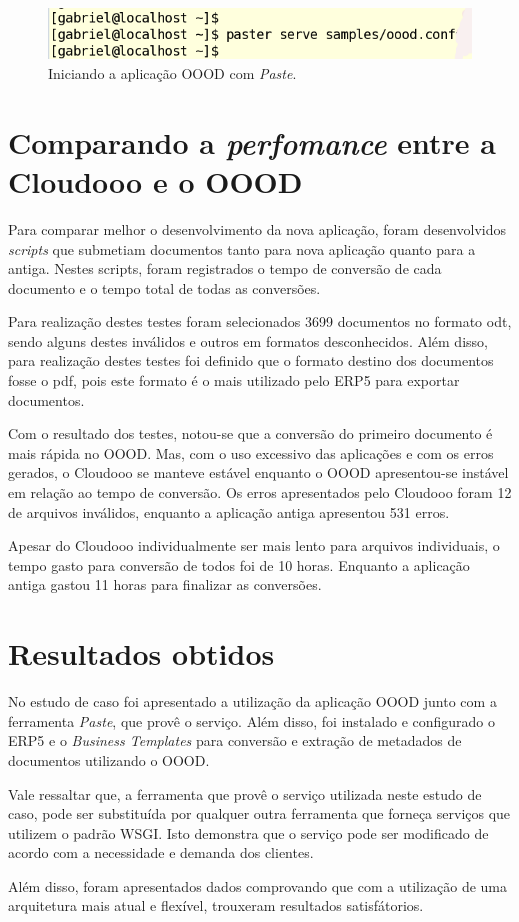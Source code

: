 \begin{figure}[!ht]
\centering
\begin{center}
\includegraphics[scale=0.570,bb=0 30 510 0]{start_paste.png}
\end{center}
\caption{Iniciando a aplicação OOOD com \textit{Paste}.}
\label{fig:start_paste}
\end{figure}

\section{Comparando a \textit{perfomance} entre a Cloudooo e o OOOD}

Para comparar melhor o desenvolvimento da nova aplicação, foram desenvolvidos \textit{scripts} que submetiam documentos tanto para nova aplicação quanto para a antiga. Nestes scripts, foram registrados o tempo de conversão de cada documento e o tempo total de todas as conversões.

Para realização destes testes foram selecionados 3699 documentos no formato odt, sendo alguns destes inválidos e outros em formatos desconhecidos. Além disso, para realização destes testes foi definido que o formato destino dos documentos fosse o pdf, pois este formato é o mais utilizado pelo ERP5 para exportar documentos.

Com o resultado dos testes, notou-se que a conversão do primeiro documento é mais rápida no OOOD. Mas, com o uso excessivo das aplicações e com os erros gerados, o Cloudooo se manteve estável enquanto o OOOD apresentou-se instável em relação ao tempo de conversão. Os erros apresentados pelo Cloudooo foram 12 de arquivos inválidos, enquanto a aplicação antiga apresentou 531 erros.

Apesar do Cloudooo individualmente ser mais lento para arquivos individuais, o tempo gasto para conversão de todos foi de 10 horas. Enquanto a aplicação antiga gastou 11 horas para finalizar as conversões.

\section{Resultados obtidos}

No estudo de caso foi apresentado a utilização da aplicação OOOD junto com a ferramenta \textit{Paste}, que provê o serviço. Além disso, foi  instalado e configurado o ERP5 e o \textit{Business Templates} para conversão e extração de metadados de documentos utilizando o OOOD.

Vale ressaltar que, a ferramenta que provê o serviço utilizada neste estudo de caso, pode ser substituída por qualquer outra ferramenta que forneça serviços que utilizem o padrão WSGI. Isto demonstra que o serviço pode ser modificado de acordo com a necessidade e demanda dos clientes.

Além disso, foram apresentados dados comprovando que com a utilização de uma arquitetura mais atual e flexível, trouxeram resultados satisfátorios.